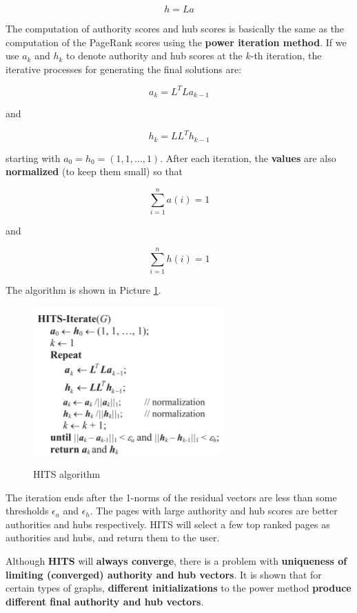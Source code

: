 \begin{equation}
    h = La
\end{equation}

The computation of authority scores and hub scores is basically the same as the computation of the PageRank scores using the \textbf{power iteration method}. If we use $a_k$ and $h_k$ to denote authority and hub scores at the $k$-th iteration, the iterative processes for generating the final solutions are:

\begin{equation}
    a_k = L^T L a_{k-1}
\end{equation}

and

\begin{equation}
    h_k = LL^T h_{k-1}
\end{equation}

starting with $a_0 = h_0 = (1, 1, …, 1)$. After each iteration, the \textbf{values} are also \textbf{normalized} (to keep them small)
so that

$$
\sum_{i = 1}^n a(i) = 1
$$

and 

$$
\sum_{i = 1}^n h(i) = 1
$$

The algorithm is shown in Picture \ref{hits}.

\begin{figure}[h!]
		\centering
        \includegraphics[scale = 1.8]{img/hits.jpg}
		\label{hits}
        \caption{HITS algorithm}
\end{figure}

The iteration ends after the 1-norms of the residual vectors are less than some thresholds $\epsilon_a$ and $\epsilon_h$. The pages with large authority and hub scores are better authorities and hubs respectively. HITS will select a few top ranked pages as authorities and hubs, and return them to the user. 

Although \textbf{HITS} will \textbf{always converge}, there is a problem with \textbf{uniqueness of limiting (converged) authority and hub vectors}. It is shown that for certain types of graphs, \textbf{different initializations} to the power method \textbf{produce} \textbf{different final authority and hub vectors}. 

